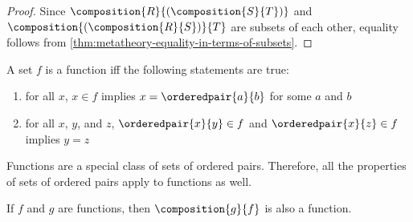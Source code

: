 \begin{proof}
    \vspace{0.3cm}
    \noindent
    Since \( \composition{R}{\mleft( \composition{S}{T} \mright)} \) and \( \composition{\mleft( \composition{R}{S} \mright)}{T} \) are subsets of each other,
    equality follows from \cref{thm:metatheory-equality-in-terms-of-subsets}.
\end{proof}

\begin{dfn}[Function]
     \label{dfn:metatheory-function}
    A set \( f \) is a function iff the following statements are true:
    \begin{enumerate}[topsep=2pt,label=\textup{\texttt{(\alph*)}}]
        \item for all \( x \), \( x \in f \) implies \( x = \orderedpair{a}{b} \) for some \( a \) and \( b \)
        \item for all \( x \), \( y \), and \( z \), \( \orderedpair{x}{y} \in f \) and \( \orderedpair{x}{z} \in f \) implies \( y = z \)
    \end{enumerate}
\end{dfn}

\begin{rem}
    Functions are a special class of sets of ordered pairs.
    Therefore, all the properties of sets of ordered pairs apply to functions as well.
\end{rem}

\begin{thm}
     \label{thm:metatheory-the-composition-of-functions-is-a-function}
    If \( f \) and \( g \) are functions, then \( \composition{g}{f} \) is also a function.
\end{thm}

